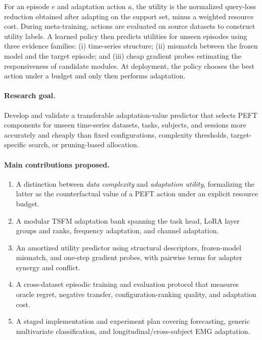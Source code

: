\documentclass[10pt]{article}
\begin{document}
For an episode $e$ and adaptation action $a$, the utility is the normalized query-loss reduction obtained after adapting on the support set, minus a weighted resource cost. During meta-training, actions are evaluated on source datasets to construct utility labels. A learned policy then predicts utilities for unseen episodes using three evidence families: (i) time-series structure; (ii) mismatch between the frozen model and the target episode; and (iii) cheap gradient probes estimating the responsiveness of candidate modules. At deployment, the policy chooses the best action under a budget and only then performs adaptation.

\paragraph{Research goal.}
Develop and validate a transferable adaptation-value predictor that selects PEFT components for unseen time-series datasets, tasks, subjects, and sessions more accurately and cheaply than fixed configurations, complexity thresholds, target-specific search, or pruning-based allocation.

\paragraph{Main contributions proposed.}
\begin{enumerate}[leftmargin=*, itemsep=2pt, topsep=2pt]
    \item A distinction between \emph{data complexity} and \emph{adaptation utility}, formalizing the latter as the counterfactual value of a PEFT action under an explicit resource budget.
    \item A modular TSFM adaptation bank spanning the task head, LoRA layer groups and ranks, frequency adaptation, and channel adaptation.
    \item An amortized utility predictor using structural descriptors, frozen-model mismatch, and one-step gradient probes, with pairwise terms for adapter synergy and conflict.
    \item A cross-dataset episodic training and evaluation protocol that measures oracle regret, negative transfer, configuration-ranking quality, and adaptation cost.
    \item A staged implementation and experiment plan covering forecasting, generic multivariate classification, and longitudinal/cross-subject EMG adaptation.
\end{enumerate}
\end{document}
